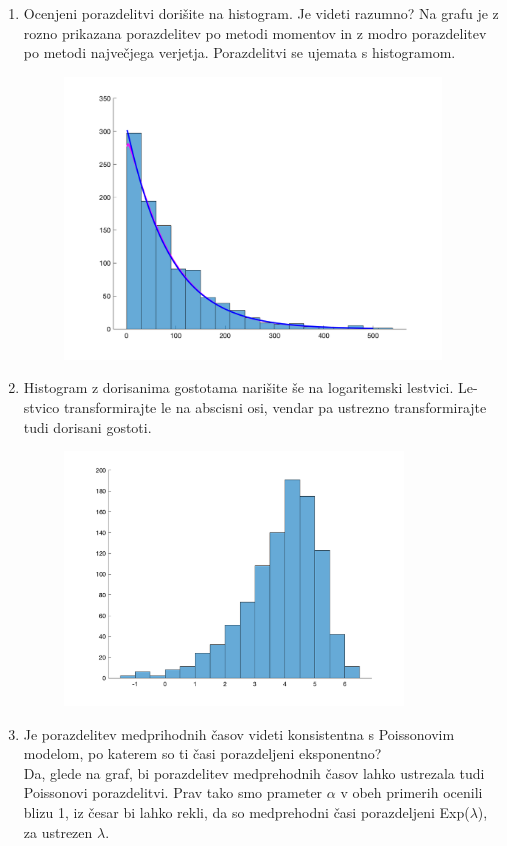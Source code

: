 \documentclass[a4paper]{article}
\begin{document}
\begin{enumerate}[label=(\alph*)]
\item Ocenjeni porazdelitvi dorišite na histogram. Je videti razumno?
Na grafu je z rozno prikazana porazdelitev po metodi momentov in z modro porazdelitev po metodi največjega verjetja. Porazdelitvi se ujemata s histogramom.
\begin{figure}[h!]
\centering
\includegraphics[width=10cm]{histogram_porazdelitve3.png}
\label{Histogram prehodnih časov z ocenjenima porazdelitvama}
\end{figure}

\item Histogram z dorisanima gostotama narišite še na logaritemski lestvici. Le- stvico transformirajte le na abscisni osi, vendar pa ustrezno transformirajte tudi dorisani gostoti.

\begin{figure}[h!]
\centering
\includegraphics[width=9cm]{loghistogram3.png}
\label{Histogram prehodnih časov z ocenjenima porazdelitvama}
\end{figure}

\item Je porazdelitev medprihodnih časov videti konsistentna s Poissonovim modelom, po katerem so ti časi porazdeljeni eksponentno? \\
Da, glede na graf, bi porazdelitev medprehodnih časov lahko ustrezala tudi Poissonovi porazdelitvi. Prav tako smo prameter $\alpha$ v obeh primerih ocenili blizu 1, iz česar bi lahko rekli, da so medprehodni časi porazdeljeni Exp($\lambda$), za ustrezen $\lambda$.
\end{enumerate}
\end{document}
